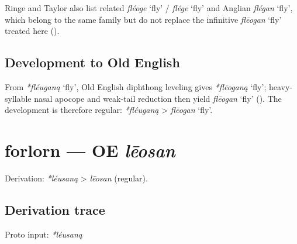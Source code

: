 \documentclass[
  british,
  a4paper,
  openany]{book}
\providecommand{\Recon}[1]{\emph{*#1}}
{\catcode`→=\active \global\def→{\ensuremath{\rightarrow}}}
\providecommand{\texorpdfstring}[2]{#1}
\providecommand{\Recon}[1]{\emph{*#1}}
{\catcode`→=\active \global\def→{\ensuremath{\rightarrow}}}
\begin{document}
Ringe and Taylor also list related \emph{fléoge} `fly' / \emph{flége}
`fly' and Anglian \emph{flégan} `fly', which belong to the same family
but do not replace the infinitive \emph{flēogan} `fly' treated here
().

\subsection{Development to Old
English}\label{development-to-old-english-18}

From \Recon{fléuganą} `fly', Old English diphthong leveling gives
\Recon{flēoganą} `fly'; heavy-syllable nasal apocope and weak-tail
reduction then yield \emph{flēogan} `fly'
(). The development
is therefore regular: \emph{*fléuganą} \textgreater{} \emph{flēogan}
`fly'.

\section{\texorpdfstring{forlorn --- OE
\emph{lēosan}}{forlorn --- OE lēosan}}\label{forlorn-oe-lux113osan}


Derivation: \emph{*léusaną} \textgreater{} \emph{lēosan} (regular).

\subsection{Derivation trace}\label{derivation-trace-19}

Proto input: \emph{*léusaną}

\begingroup
\setlength{\fboxsep}{6pt}
\end{document}
